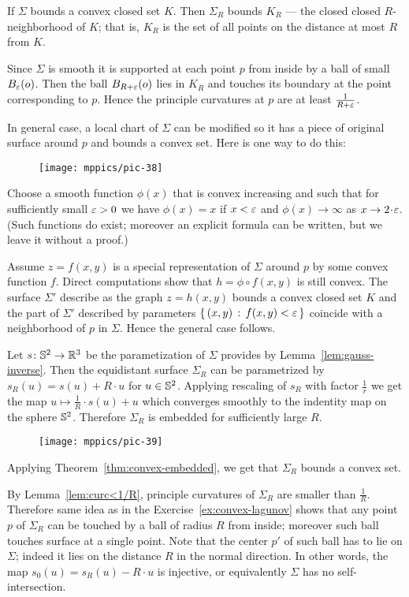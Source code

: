 If $\Sigma$ bounds a convex closed set $K$.
Then $\Sigma_R$ bounds $K_R$ --- the closed closed $R$-neighborhood of $K$;
that is, $K_R$ is the set of all points on the distance at most $R$ from $K$.

Since $\Sigma$ is smooth it is supported at each point $p$ from inside by a ball of small $B_\varepsilon(o)$.
Then the ball $B_{R+\varepsilon}(o)$ lies in $K_R$ and touches its boundary at the point corresponding to $p$.
Hence the principle curvatures at $p$ are at least $\tfrac1{R+\varepsilon}$.

In general case, a local chart of $\Sigma$ can be modified so it has a piece of original surface around $p$  and bounds a convex set.
Here is one way to do this:

\begin{wrapfigure}{r}{30 mm}
\vskip-0mm
\centering
\texttt{[image: mppics/pic-38]}
\vskip-0mm
\end{wrapfigure}

Choose a smooth function $\phi(x)$ that is convex increasing and such that for sufficiently small $\varepsilon>0$ we have $\phi(x)=x$ if $x<\varepsilon$ and $\phi(x)\to\infty$ as $x\to 2\cdot\eps$.
(Such functions do exist; moreover an explicit formula can be written, but we leave it without a proof.)

Assume $z=f(x,y)$ is a special representation of $\Sigma$ around $p$ by some convex function $f$.
Direct computations show that $h=\phi\circ f(x,y)$ is still convex.
The surface $\Sigma'$ describe as the graph $z=h(x,y)$ bounds a convex closed set $K$ and the part of $\Sigma'$ described by parameters $\left\{\,{(x,y)}\,:\,{f(x,y)<\varepsilon}\,\right\}$ coincide with a neighborhood of $p$ in $\Sigma$.
Hence the general case follows.\qeds

Let $s\:\SS^2\z\to\RR^3$ be the parametization of $\Sigma$ provides by Lemma~\ref{lem:gauss-inverse}.
Then the equidistant surface $\Sigma_R$ can be parametrized by $s_R(u)= s(u)+R\cdot u$ for $u\in\mathbb{S}^2$.
Applying rescaling of $s_R$ with factor $\tfrac1r$ we get the map $u\mapsto \tfrac1R\cdot s(u)+u$ which converges smoothly to the indentity map on the sphere $\mathbb{S}^2$.
Therefore $\Sigma_R$ is embedded for sufficiently large $R$.

\begin{wrapfigure}{r}{47 mm}
\vskip-0mm
\centering
\texttt{[image: mppics/pic-39]}
\vskip-0mm
\end{wrapfigure}

Applying Theorem~\ref{thm:convex-embedded}, we get that $\Sigma_R$ bounds a convex set.

By Lemma~\ref{lem:curc<1/R}, principle curvatures of $\Sigma_R$ are smaller than $\tfrac1R$.
Therefore same idea as in the Exercise~\ref{ex:convex-lagunov} shows that any point $p$ of $\Sigma_R$ can be touched by a ball of radius $R$ from inside; 
moreover such ball touches surface at a single point.
Note that the center $p'$ of such ball has to lie on $\Sigma$;
indeed it lies on the distance $R$ in the normal direction.
In other words, the map $s_0(u)=s_R(u)-R\cdot u$ is injective, or equivalently $\Sigma$  has no self-intersection.
\qeds

